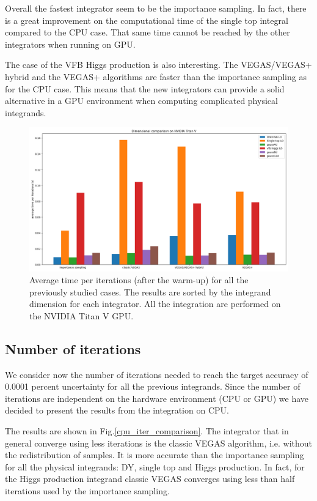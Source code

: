 \documentclass[../main/main.tex]{subfiles}
\begin{document}
Overall the fastest integrator seem to be the importance sampling. In fact, there is a great improvement on the computational time of the single top integral compared to the CPU case. That same time cannot be reached by the other integrators when running on GPU.

The case of the VFB Higgs production is also interesting. The VEGAS/VEGAS+ hybrid and the VEGAS+ algorithms are faster than the importance sampling as for the CPU case. This means that the new integrators can provide a solid alternative in a GPU environment when computing complicated physical integrands.

\begin{figure}[h]
	\centering
	\includegraphics[width=\textwidth]{../images/dim_comparison_GPU.png}
	\caption{Average time per iterations (after the warm-up) for all the previously studied cases. The results are sorted by the integrand dimension for each integrator. All the integration are performed on the NVIDIA Titan V GPU. }
	\label{gpu_time_comparison}
\end{figure}


\subsection{Number of iterations}
We consider now the number of iterations needed to reach the target accuracy of 0.0001 percent uncertainty for all the previous integrands. Since the number of iterations are independent on the hardware environment (CPU or GPU) we have decided to present the results from the integration on CPU. 

The results are shown in Fig.\ref{cpu_iter_comparison}. The integrator that in general converge
using less iterations is the classic VEGAS algorithm, i.e. without the redistribution of samples. It is more accurate than the importance sampling for all the physical integrands: DY, single top and Higgs production. In fact, for the Higgs production integrand classic VEGAS converges using less than half iterations used by the importance sampling.
\end{document}
